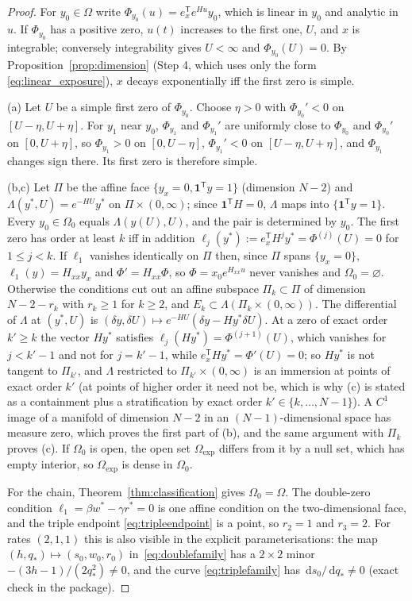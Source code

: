 \documentclass[11pt,a4paper]{article}
\theoremstyle{definition}\newtheorem{definition}[theorem]{Definition}
\theoremstyle{remark}\newtheorem{remark}[theorem]{Remark}
\newcommand{\dd}{\,\mathrm d}
\newcommand{\one}{\mathbf 1}
\begin{document}
\begin{proof}
For $y_0\in\Omega$ write $\Phi_{y_0}(u)=e_x^{\mathsf T}e^{Hu}y_0$, which
is linear in $y_0$ and analytic in $u$. If $\Phi_{y_0}$ has a positive
zero, $u(t)$ increases to the first one, $U$, and $x$ is integrable;
conversely integrability gives $U<\infty$ and $\Phi_{y_0}(U)=0$. By
Proposition~\ref{prop:dimension} (Step 4, which uses only the form
\eqref{eq:linear_exposure}), $x$ decays exponentially iff the first zero
is simple.

(a) Let $U$ be a simple first zero of $\Phi_{y_0}$. Choose $\eta>0$ with
$\Phi_{y_0}'<0$ on $[U-\eta,U+\eta]$. For $y_1$ near $y_0$, $\Phi_{y_1}$
and $\Phi_{y_1}'$ are uniformly close to $\Phi_{y_0}$ and $\Phi_{y_0}'$
on $[0,U+\eta]$, so $\Phi_{y_1}>0$ on $[0,U-\eta]$, $\Phi_{y_1}'<0$ on
$[U-\eta,U+\eta]$, and $\Phi_{y_1}$ changes sign there. Its first zero
is therefore simple.

(b,c) Let $\Pi$ be the affine face $\{y_x=0,\one^{\mathsf T}y=1\}$
(dimension $N-2$) and $\Lambda(y^*,U)=e^{-HU}y^*$ on $\Pi\times(0,\infty)$;
since $\one^{\mathsf T}H=0$, $\Lambda$ maps into $\{\one^{\mathsf T}y=1\}$.
Every $y_0\in\Omega_0$ equals $\Lambda(y(U),U)$, and the pair is
determined by $y_0$. The first zero has order at least $k$ iff in
addition $\ell_j(y^*):=e_x^{\mathsf T}H^jy^*=\Phi^{(j)}(U)=0$ for
$1\le j<k$. If $\ell_1$ vanishes identically on $\Pi$ then, since $\Pi$
spans $\{y_x=0\}$, $\ell_1(y)=H_{xx}y_x$ and $\Phi'=H_{xx}\Phi$, so
$\Phi=x_0e^{H_{xx}u}$ never vanishes and $\Omega_0=\varnothing$.
Otherwise the conditions cut out an affine subspace $\Pi_k\subset\Pi$ of
dimension $N-2-r_k$ with $r_k\ge1$ for $k\ge2$, and
$E_k\subset\Lambda(\Pi_k\times(0,\infty))$. The differential of
$\Lambda$ at $(y^*,U)$ is $(\delta y,\delta U)\mapsto e^{-HU}(\delta y-Hy^*\delta U)$.
At a zero of exact order $k'\ge k$ the vector $Hy^*$ satisfies
$\ell_j(Hy^*)=\Phi^{(j+1)}(U)$, which vanishes for $j<k'-1$ and not for
$j=k'-1$, while $e_x^{\mathsf T}Hy^*=\Phi'(U)=0$; so $Hy^*$ is not
tangent to $\Pi_{k'}$, and $\Lambda$ restricted to $\Pi_{k'}\times(0,\infty)$
is an immersion at points of exact order $k'$ (at points of higher order
it need not be, which is why (c) is stated as a containment plus a
stratification by exact order $k'\in\{k,\dots,N-1\}$). A $C^1$ image of
a manifold of dimension $N-2$ in an $(N-1)$-dimensional space has
measure zero, which proves the first part of (b), and the same argument
with $\Pi_k$ proves (c). If $\Omega_0$ is open, the open set
$\Omega_{\exp}$ differs from it by a null set, which has empty
interior, so $\Omega_{\exp}$ is dense in $\Omega_0$.

For the chain, Theorem~\ref{thm:classification} gives $\Omega_0=\Omega$.
The double-zero condition $\ell_1=\beta w^*-\gamma r^*=0$ is one affine
condition on the two-dimensional face, and the triple endpoint
\eqref{eq:tripleendpoint} is a point, so $r_2=1$ and $r_3=2$. For rates
$(2,1,1)$ this is also visible in the explicit parameterisations: the
map $(h,q_*)\mapsto(s_0,w_0,r_0)$ in~\eqref{eq:doublefamily} has a
$2\times2$ minor $-(3h-1)/(2q_*^2)\ne0$, and the curve
\eqref{eq:triplefamily} has $\dd s_0/\dd q_*\ne0$ (exact check in the
package).
\end{proof}
\end{document}

